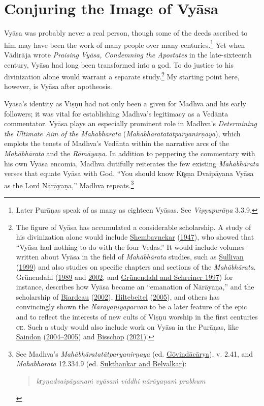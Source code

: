 \section{Conjuring the Image of Vyāsa}
      Vyāsa was probably never a real person, though some of the deeds ascribed to him may have been the work of many people over many centuries.\footnote{%
Later Purāṇas speak of as many as eighteen Vyāsas. See \emph{{Viṣṇupurāṇa}} 3.3.9.
}
 Yet when Vādirāja wrote \emph{Praising Vyāsa, Condemning the Apostates} in the late-sixteenth century, Vyāsa had long been transformed into a god. To do justice to his divinization alone would warrant a separate study.\footnote{%
The figure of Vyāsa has accumulated a considerable scholarship. A study of his divinization alone would include \hyperref[Shembavnekar1947]{Shembavnekar} (\hyperref[Shembavnekar1947]{1947}), who showed that “Vyāsa had nothing to do with the four Vedas.” It would include volumes written about Vyāsa in the field of \emph{Mahābhārata} studies, such as \hyperref[Sullivan1999]{Sullivan} (\hyperref[Sullivan1999]{1999}) and also studies on specific chapters and sections of the \emph{Mahābhārata}. Grünendahl (\hyperref[Gruenendahl1989]{1989} and \hyperref[Gruenendahl2002]{2002}, and \hyperref[Gruenendahl1997]{Grünendahl and Schreiner 1997}) for instance, describes how Vyāsa became an “emanation of Nārāyaṇa,” and the scholarship of \hyperref[Biardeau2002]{Biardeau} (\hyperref[Biardeau2002]{2002}), \hyperref[Hiltebeitel2005]{Hiltebeitel} (\hyperref[Hiltebeitel2005]{2005}), and others has convincingly shown the \emph{{Nārāyaṇīyaparvan}} to be a later feature of the epic and to reflect the interests of new cults of Viṣṇu worship in the first centuries \textsc{ce}. Such a study would also include work on Vyāsa in the Purāṇas, like \hyperref[Saindon20042005]{Saindon} (\hyperref[Saindon20042005]{2004–2005}) and \hyperref[Bisschop2021]{Bisschop} (\hyperref[Bisschop2021]{2021}). 
}
 My starting point here, however, is Vyāsa after apotheosis.


Vyāsa’s identity as Viṣṇu had not only been a given for Madhva and his early followers; it was vital for establishing Madhva’s legitimacy as a Vedānta commentator. Vyāsa plays an especially prominent role in Madhva’s \emph{Determining the Ultimate Aim of the Mahābhārata} (\emph{{Mahābhāratatātparyanirṇaya}}), which emplots the tenets of Madhva’s Vedānta within the narrative arcs of the \emph{Mahābhārata} and the \emph{Rāmāyaṇa}. In addition to peppering the commentary with his own Vyāsa encomia, Madhva dutifully reiterates the few existing \emph{Mahābhārata} verses that equate Vyāsa with God. “You should know Kr̥ṣṇa Dvaipāyana Vyāsa as the Lord Nārāyaṇa,” Madhva repeats.\footnote{%
See Madhva’s \emph{{Mahābhāratatātparyanirṇaya}} (ed. \hyperref[Madhva2009]{Gōvindācārya}), v. 2.41, and \emph{Mahābhārata} 12.334.9 (ed. \hyperref[MBh]{Sukthankar and Belvalkar}):

\vspace{-1.5ex}\begin{quote}\raggedright
      \emph{kr̥ṣṇadvaipāyanaṁ vyāsaṁ viddhi nārāyaṇaṁ prabhum}\end{quote}\vspace{-1.5ex}
      }



